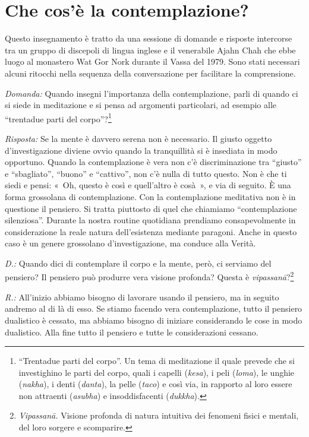 \chapter{Che cos'è la contemplazione?}

\begin{openingQuote}
  \centering

  Questo insegnamento è tratto da una sessione di domande e risposte intercorse
  tra un gruppo di discepoli di lingua inglese e il venerabile Ajahn Chah che
  ebbe luogo al monastero Wat Gor Nork durante il Vassa del 1979. Sono stati
  necessari alcuni ritocchi nella sequenza della conversazione per facilitare la
  comprensione.
\end{openingQuote}

\emph{Domanda:} Quando insegni l'importanza della contemplazione, parli di
quando ci si siede in meditazione e si pensa ad argomenti particolari,
ad esempio alle ``trentadue parti del
corpo''?\footnote{``Trentadue parti del corpo''. Un
  tema di meditazione il quale prevede che si investighino le parti del
  corpo, quali i capelli (\emph{kesa}), i peli (\emph{loma}), le unghie
  (\emph{nakha}), i denti (\emph{danta}), la pelle (\emph{taco}) e così
  via, in rapporto al loro essere non attraenti (\emph{asubha}) e
  insoddisfacenti (\emph{dukkha}).}

\emph{Risposta:} Se la mente è davvero serena non è necessario. Il giusto
oggetto d'investigazione diviene ovvio quando la tranquillità si è
insediata in modo opportuno. Quando la contemplazione è vera non c'è
discriminazione tra ``giusto'' e ``sbagliato'', ``buono'' e ``cattivo'',
non c'è nulla di tutto questo. Non è che ti siedi e pensi: «~Oh, questo
è così e quell'altro è cosà~», e via di seguito. È una forma grossolana
di contemplazione. Con la contemplazione meditativa non è in questione
il pensiero. Si tratta piuttosto di quel che chiamiamo ``contemplazione
silenziosa''. Durante la nostra routine quotidiana prendiamo
consapevolmente in considerazione la reale natura dell'esistenza
mediante paragoni. Anche in questo caso è un genere grossolano
d'investigazione, ma conduce alla Verità.

\emph{D.:} Quando dici di contemplare il corpo e la mente, però, ci serviamo
del pensiero? Il pensiero può produrre vera visione profonda? Questa è
\emph{vipassanā}?\footnote{\emph{Vipassanā.} Visione
  profonda di natura intuitiva dei fenomeni fisici e mentali, del loro
  sorgere e scomparire.}

\emph{R.:} All'inizio abbiamo bisogno di lavorare usando il pensiero, ma in
seguito andremo al di là di esso. Se stiamo facendo vera contemplazione,
tutto il pensiero dualistico è cessato, ma abbiamo bisogno di iniziare
considerando le cose in modo dualistico. Alla fine tutto il pensiero e
tutte le considerazioni cessano.

